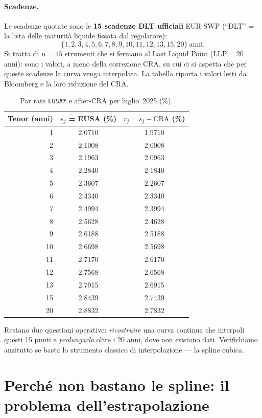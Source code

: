 \documentclass[11pt,a4paper]{article}
\theoremstyle{plain}
\theoremstyle{definition}
\theoremstyle{remark}
\newcommand{\LLP}{\ensuremath{\mathrm{LLP}}}
\newcommand{\CRA}{\ensuremath{\mathrm{CRA}}}
\begin{document}
\paragraph{Scadenze.} Le scadenze quotate sono le \textbf{15 scadenze DLT ufficiali} EUR SWP
(``DLT'' = la lista delle maturit\`a liquide fissata dal regolatore):
\[
  \{1,2,3,4,5,6,7,8,9,10,11,12,13,15,20\}\ \text{anni}.
\]
Si tratta di $n=15$ strumenti che si fermano al Last Liquid Point ($\LLP = 20$ anni): sono i valori, a meno della correzione CRA, su cui ci si aspetta che per queste scadenze la curva venga interpolata. La tabella riporta i valori letti da Bloomberg e la loro riduzione del CRA.

\begin{table}[H]
\centering\small
\caption{Par rate \texttt{EUSA*} e after-CRA per luglio~2025 (\%).}
\label{tab:input-jul}
\renewcommand{\arraystretch}{1.15}
\begin{tabular}{rcc}
\toprule
\textbf{Tenor} (anni) & $s_j$ = EUSA (\%) & $r_j = s_j - \CRA$ (\%)\\
\midrule
 1  & 2.0710 & 1.9710\\
 2  & 2.1008 & 2.0008\\
 3  & 2.1963 & 2.0963\\
 4  & 2.2840 & 2.1840\\
 5  & 2.3607 & 2.2607\\
 6  & 2.4340 & 2.3340\\
 7  & 2.4994 & 2.3994\\
 8  & 2.5628 & 2.4628\\
 9  & 2.6188 & 2.5188\\
10  & 2.6698 & 2.5698\\
11  & 2.7170 & 2.6170\\
12  & 2.7568 & 2.6568\\
13  & 2.7915 & 2.6915\\
15  & 2.8439 & 2.7439\\
20  & 2.8832 & 2.7832\\
\bottomrule
\end{tabular}
\end{table}

Restano due questioni operative: \emph{ricostruire} una curva continua che interpoli questi
15 punti e \emph{prolungarla} oltre i 20 anni, dove non esistono dati. Verifichiamo
anzitutto se basta lo strumento classico di interpolazione --- la spline cubica.

\section{Perch\'e non bastano le spline: il problema dell'estrapolazione}
\label{sec:spline-limite}
\end{document}
